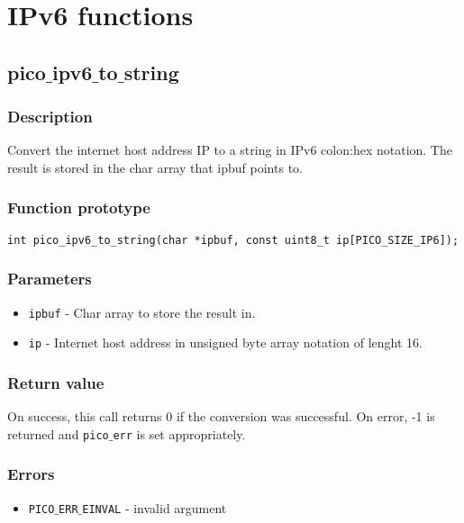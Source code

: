 \section{IPv6 functions}


\subsection{pico$\_$ipv6$\_$to$\_$string}

\subsubsection*{Description}
Convert the internet host address IP to a string in IPv6 colon:hex notation.
The result is stored in the char array that ipbuf points to.

\subsubsection*{Function prototype}
\begin{verbatim}
int pico_ipv6_to_string(char *ipbuf, const uint8_t ip[PICO_SIZE_IP6]);
\end{verbatim}

\subsubsection*{Parameters}
\begin{itemize}[noitemsep]
\item \texttt{ipbuf} - Char array to store the result in.
\item \texttt{ip} - Internet host address in unsigned byte array notation of lenght 16.
\end{itemize}

\subsubsection*{Return value}
On success, this call returns 0 if the conversion was successful.
On error, -1 is returned and \texttt{pico$\_$err} is set appropriately.

\subsubsection*{Errors}
\begin{itemize}[noitemsep]
\item \texttt{PICO$\_$ERR$\_$EINVAL} - invalid argument
\end{itemize}

